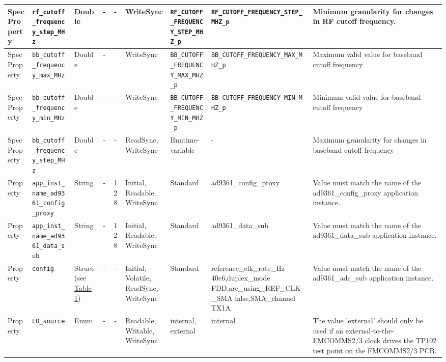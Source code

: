 \begin{landscape}
\begin{scriptsize}
\begin{longtable}{|p{1.8cm}|p{4.1cm}|p{1cm}|c|c|p{1.6cm}|p{3.7cm}|p{3.7cm}|p{2.5cm}|}
			\hline
			SpecProperty & \verb+rf_cutoff_frequency_step_MHz+ & Double& -        & -          & WriteSync      & \verb+RF_CUTOFF_FREQUENCY_STEP_MHZ_p+ & \verb+RF_CUTOFF_FREQUENCY_STEP_MHZ_p+ & Minimum granularity for changes in RF cutoff frequency. \\
			\hline
			SpecProperty & \verb+bb_cutoff_frequency_max_MHz+  & Double& -        & & WriteSync      & \verb+BB_CUTOFF_FREQUENCY_MAX_MHZ_p+ & \verb+BB_CUTOFF_FREQUENCY_MAX_MHZ_p+ & Maximum valid value for baseband cutoff frequency                                                                                                                                                                           \\
			\hline
			SpecProperty & \verb+bb_cutoff_frequency_min_MHz+  & Double& -        & -          & WriteSync      & \verb+BB_CUTOFF_FREQUENCY_MIN_MHZ_p+ & \verb+BB_CUTOFF_FREQUENCY_MIN_MHZ_p+ & Minimum valid value for baseband cutoff frequency                                                                                                                                                                           \\
			\hline
			SpecProperty & \verb+bb_cutoff_frequency_step_MHz+ & Double& -        & -          & ReadSync, WriteSync & Runtime-variable & - & Maximum granularity for changes in baseband cutoff frequency                                                                                                                                                                \\
			\hline
			Property & \verb+app_inst_name_ad9361_config_proxy+ &String& -        & 128        & Initial, Readable, WriteSync & Standard & ad9361\_config\_proxy & Value must match the name of the ad9361\_config\_proxy application instance. \\
			\hline
			Property & \verb+app_inst_name_ad9361_data_sub+ &String& -        & 128        & Initial, Readable, WriteSync & Standard & ad9361\_data\_sub & Value must match the name of the ad9361\_data\_sub application instance. \\
			\hline
			Property & \verb+config+ & Struct (see \hyperlink{tab1}{Table 1}) & -        & -        & Initial, Volatile, ReadSync, WriteSync & Standard & reference\_clk\_rate\_Hz 40e6,duplex\_mode FDD,are\_using\_REF\_CLK\_SMA false,SMA\_channel TX1A & Value must match the name of the ad9361\_adc\_sub application instance. \\
			\hline
			Property & \verb+LO_source+ &Enum& -        & -        & Readable, Writable, WriteSync & internal, external  & internal & The value 'external' should only be used if an external-to-the-FMCOMMS2/3 clock drives the TP102 test point on the FMCOMMS2/3 PCB. \\
			\hline
		\end{longtable}
	\end{scriptsize}


\end{landscape}
